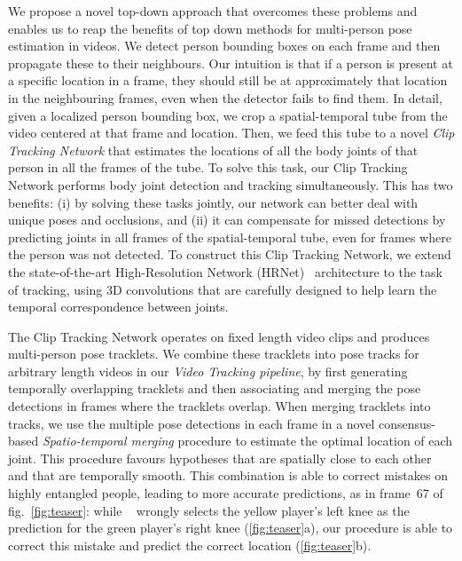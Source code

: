 \documentclass[10pt,twocolumn,letterpaper]{article}
\begin{document}
We propose a novel top-down approach that overcomes these problems and enables us to reap the benefits of top down methods for multi-person pose estimation in videos.
We detect person bounding boxes on each frame and then propagate these to their neighbours. Our intuition is that if a person is present at a specific location in a frame, they should still be at approximately that location in the neighbouring frames, even when the detector fails to find them.
In detail, given a localized person bounding box, we crop a spatial-temporal tube from the video centered at that frame and location. Then, we feed this tube to a novel {\it Clip Tracking Network} that estimates the locations of all the body joints of that person in all the frames of the tube. To solve this task, our Clip Tracking Network performs body joint detection and tracking simultaneously. This has two benefits: (i) by solving these tasks jointly, our network can better deal with unique poses and occlusions, and (ii) it can compensate for missed detections by predicting joints in all frames of the spatial-temporal tube, even for frames where the person was not detected. To construct this Clip Tracking Network, we extend the state-of-the-art High-Resolution Network (HRNet)~\cite{sun2019deep} architecture to the task of tracking, using 3D convolutions that are carefully designed to help learn the temporal correspondence between joints. 

The Clip Tracking Network operates on fixed length video clips and produces multi-person pose tracklets. We combine these tracklets into pose tracks for arbitrary length videos in our {\it Video Tracking pipeline}, by first generating temporally overlapping tracklets and then associating and merging the pose detections in frames where the tracklets overlap. When merging tracklets into tracks, we use the multiple pose detections in each frame in a novel consensus-based {\it Spatio-temporal merging} procedure to estimate the optimal location of each joint.
This procedure favours hypotheses that are spatially close to each other and that are temporally smooth. This combination is able to correct mistakes on highly entangled people, leading to more accurate predictions, as in frame~67 of fig.~\ref{fig:teaser}{\color{red}}: while ~\cite{sun2019deep} wrongly selects the yellow player's left knee as the prediction for the green player's right knee (\ref{fig:teaser}{\color{red}a}), our procedure is able to correct this mistake and predict the correct location (\ref{fig:teaser}{\color{red}b}). 
\end{document}
